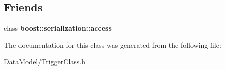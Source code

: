 \subsection*{Friends}
\begin{DoxyCompactItemize}
\item 
\hypertarget{classTriggerClass_ac98d07dd8f7b70e16ccb9a01abf56b9c}{
class {\bfseries boost::serialization::access}}
\label{classTriggerClass_ac98d07dd8f7b70e16ccb9a01abf56b9c}

\end{DoxyCompactItemize}


The documentation for this class was generated from the following file:\begin{DoxyCompactItemize}
\item 
DataModel/TriggerClass.h\end{DoxyCompactItemize}
